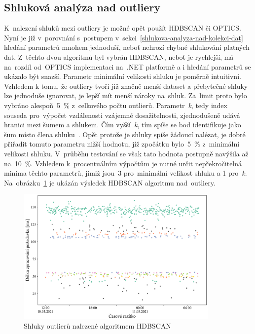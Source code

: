 \subsection{Shluková analýza nad outliery}
K~nalezení shluků mezi outliery je možné opět použít HDBSCAN či OPTICS. Nyní je již v~porovnání s~postupem v~sekci~\ref{shlukova-analyza-nad-kolekci-dat} hledání parametrů mnohem jednoduší, neboť nehrozí chybné shlukování platných dat. Z~těchto dvou algoritmů byl vybrán HDBSCAN, neboť je rychlejší, má na~rozdíl od~OPTICS implementaci na~.NET platformě a i hledání parametrů se ukázalo být snazší. Parametr minimální velikosti shluku je poměrně intuitivní. Vzhledem k tomu, že outliery tvoří již značně menší dataset a přebytečné shluky lze jednoduše ignorovat, je lepší mít menší nároky na~shluk. Za~limit proto bylo vybráno alespoň~5~\% z~celkového počtu outlierů. Parametr~\emph{k}, tedy index souseda pro~výpočet vzdálenosti vzájemné dosažitelnosti, zjednodušeně udává hranici mezi šumem a shlukem. Čím vyšší~\emph{k}, tím spíše se bod identifikuje jako šum místo člena shluku~\cite{hdbscan}. Opět protože je shluky spíše žádoucí nalézat, je dobré přiřadit tomuto parametru nižší hodnotu, jíž zpočátku bylo~5~\% z~minimální velikosti shluku. V~průběhu testování se však tato hodnota postupně navýšila až na~10~\%. Vzhledem k~procentuálním výpočtům je nutné určit nepřekročitelná minima těchto parametrů, jimiž jsou~3 pro~minimální velikost shluku a 1 pro~\emph{k}. Na~obrázku~\ref{anomaly-detection-hdbscan-img} je ukázán výsledek HDBSCAN algoritmu nad~outliery.

\begin{figure}[hbt]
    \centering
    \includegraphics[width=0.88\textwidth]{obrazky/anomaly-detection-hdbscan.pdf}
    \caption{Shluky outlierů nalezené algoritmem HDBSCAN}
    \label{anomaly-detection-hdbscan-img}
\end{figure}

